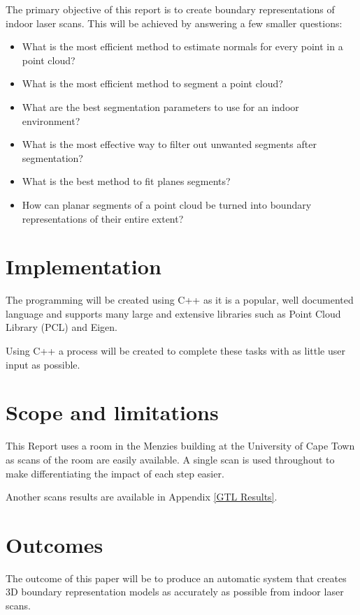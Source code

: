 		The primary objective of this report is to create boundary representations of indoor laser scans. This will be achieved by answering a few smaller questions:
		
		\begin{itemize}
			\item What is the most efficient method to estimate normals for every point in a point cloud?
			
			\item What is the most efficient method to segment a point cloud?
			
			\item What are the best segmentation parameters to use for an indoor environment?
			
			\item What is the most effective way to filter out unwanted segments after segmentation?
			
			\item What is the best method to fit planes segments?
			
			\item How can planar segments of a point cloud be turned into boundary representations of their entire extent?
			
		\end{itemize}
	
	\section{Implementation}
	
		The programming will be created using C++ as it is a popular, well documented language and supports many large and extensive libraries such as Point Cloud Library (PCL) and Eigen. 
		
		Using C++ a process will be created to complete these tasks with as little user input as possible.
	
	\section{Scope and limitations}
		This Report uses a room in the Menzies building at the University of Cape Town as scans of the room are easily available. A single scan is used throughout to make differentiating the impact of each step easier.
		
		Another scans results are available in Appendix \ref{GTL Results}.
		
	\section{Outcomes}
	
		The outcome of this paper will be to produce an automatic system that creates 3D boundary representation models as accurately as possible from indoor laser scans.
	
	
	
	



